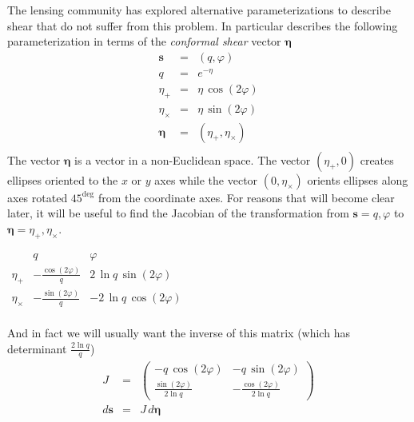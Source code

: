 \documentclass[modern]{aastex62}
\begin{document}
The lensing community has explored alternative parameterizations to describe shear that do not suffer from this problem.
In particular \citet{bernstein02} describes the following parameterization in terms of the \emph{conformal shear}  vector $\pmb{\eta}$
\begin{eqnarray}
  \pmb{s} & = & (q, \varphi) \\
  q & = & e^{-\eta} \\
  \eta_+ & = & \eta \, \cos (2\varphi) \\
  \eta_\times & = & \eta \, \sin (2\varphi) \\
  \pmb{\eta} & = &  ( \eta_+, \eta_\times) \\
\end{eqnarray}
The vector $\pmb{\eta}$ is a vector in a non-Euclidean space.  The vector $( \eta_+, 0)$ creates ellipses oriented to the $x$ or $y$ axes while the vector $ (0, \eta_\times)$ orients ellipses along axes rotated $45^{\deg}$ from the coordinate axes.
For reasons that will become clear later, it will be useful to find the Jacobian of the transformation from $\pmb{s} = q, \varphi$ to $\pmb{\eta} = \eta_+, \eta_\times$.
\begin{center}
$
\begin{array}{c|cc}
 & q & \varphi \\
\hline
\eta_+           &  -\frac{\cos(2 \varphi)}{q} & 2 \, \ln q \, \sin(2 \varphi) \\
\eta_\times   & -\frac{\sin(2 \varphi)}{q}  & -2 \, \ln q \, \cos(2 \varphi) \\
\end{array}
$
\end{center}
And in fact we will usually want the inverse of this matrix (which has determinant $\frac{2\ln q}{q}$)
\begin{eqnarray}
  J  & =  & \begin{pmatrix} - q \, \cos(2\varphi) & - q \, \sin(2 \varphi) \\
    \frac{\sin(2 \varphi)}{2\ln q} & -\frac{\cos(2 \varphi)}{2\ln q}
    \end{pmatrix} \\
d\pmb{s} & = & J \, d\pmb{\eta}    
 \end{eqnarray}
\end{document}
